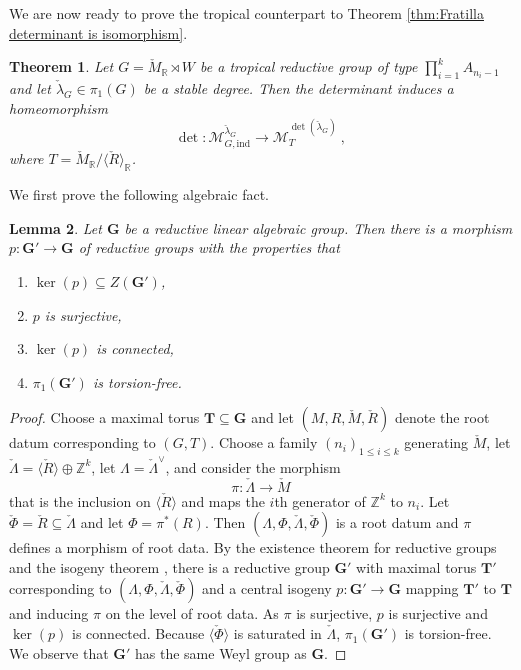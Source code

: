 \documentclass[10pt, a4paper]{amsart}
\newtheorem{theorem}{Theorem}[section]
\newtheorem{lemma}[theorem]{Lemma}
\theoremstyle{definition}
\theoremstyle{myitemstyle}
\newcommand{\R}{\mathbb{R}}
\newcommand{\Z}{\mathbb{Z}}
\newcommand{\RR}{\mathbb{R}}
\newcommand{\Mcheck}{{\check{M}}}
\newcommand{\Lambdacheck}{\check{\Lambda}}
\newcommand{\lambdacheck}{\check{\lambda}}
\newcommand{\Rcheck}{\check{R}}
\newcommand{\Phicheck}{\check{\Phi}}
\newcommand{\mc}[1]{{\mathcal{#1}}}
\newcommand{\ind}{\mathrm{ind}}
\begin{document}
We are now ready to prove the tropical counterpart to Theorem \ref{thm:Fratilla determinant is isomorphism}.


\begin{theorem}
\label{thm:determinant is isomorphism for tropical moduli of stable bundles}
Let $G= \Mcheck_\R \rtimes W$ be a tropical reductive group of type $\prod_{i=1}^k A_{n_i-1}$ and let $\lambdacheck_G\in \pi_1(G)$ be a stable degree. Then the determinant induces a homeomorphism
\[
    \det\colon \mc M^{\lambdacheck_G}_{G,\ind}\longrightarrow \mc M^{\det(\lambdacheck_G)}_{T} \ ,
\]
where $T=\Mcheck_{\RR}/\langle \Rcheck\rangle_{\RR}$. 
\end{theorem}

We first prove the following algebraic fact.

\begin{lemma}
    \label{lem:existence of cover used for degree calculation}
    Let $\mathbf{G}$ be a reductive linear algebraic group. Then there is a morphism $p\colon \mathbf{G}'\to \mathbf{G}$ of reductive groups with the properties that
    \begin{enumerate}
        \item $\ker(p)\subseteq Z(\mathbf{G}')$,
        \item $p$ is surjective,
        \item $\ker(p)$ is connected,
        \item $\pi_1(\mathbf{G}')$ is torsion-free.
    \end{enumerate}
\end{lemma}

\begin{proof}
    Choose a maximal torus $\mathbf{T}\subseteq \mathbf{G}$ and let $(M,R,\Mcheck, \Rcheck)$ denote the root datum corresponding to $(G,T)$.  Choose a family $(n_i)_{1\leq i\leq k}$ generating $\Mcheck$, let $\Lambdacheck=\langle \Rcheck\rangle \oplus \Z^k$, let $\Lambda=\Lambdacheck^\vee$, and consider the morphism
    \[
    \pi\colon \Lambdacheck \longrightarrow \Mcheck
    \]
    that is the inclusion on $\langle \Rcheck\rangle$ and maps the $i$th generator of $\Z^k$ to $n_i$. Let $\Phicheck=\Rcheck\subseteq \Lambdacheck$ and let $\Phi=\pi^*(R)$. Then $(\Lambda,\Phi,\Lambdacheck,\Phicheck)$ is a root datum and $\pi$ defines a morphism of root data. By the existence theorem for reductive groups \cite[Theorem 10.1.1]{Springer_linalggroups} and the isogeny theorem \cite[Theorem 9.6.5]{Springer_linalggroups}, there is a reductive group $\mathbf{G}'$  with maximal torus $\mathbf{T}'$ corresponding to $(\Lambda,\Phi,\Lambdacheck,\Phicheck)$ and a central isogeny $p\colon \mathbf{G}'\to \mathbf{G}$ mapping $\mathbf{T}'$ to $\mathbf{T}$ and inducing $\pi$ on the level of root data. As $\pi$ is surjective, $p$ is surjective and $\ker(p)$ is connected. Because $\langle\Phicheck\rangle$ is saturated in $\Lambdacheck$, $\pi_1(\mathbf{G}')$ is torsion-free. We observe that $\mathbf{G}'$ has the same Weyl group as $\mathbf{G}$.
\end{proof}
\end{document}
